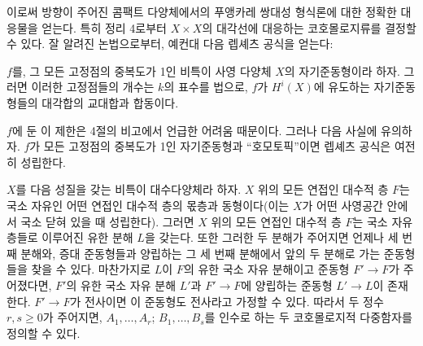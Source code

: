 이로써 방향이 주어진 콤팩트 다양체에서의 푸앵카레 쌍대성 형식론에
대한 정확한 대응물을 얻는다. 특히 정리 4로부터 $X\times X$의
대각선에 대응하는 코호몰로지류를 결정할 수 있다. 잘 알려진
논법으로부터, 예컨대 다음 렙셰츠 공식을 얻는다:

 $f$를, 그 모든 고정점의 중복도가 1인 비특이 사영
다양체 $X$의 자기준동형이라 하자. 그러면 이러한 고정점들의 개수는
$k$의 표수를 법으로,
$f$가 $H^{i}(X)$에 유도하는 자기준동형들의 대각합의 교대합과
합동이다.

$f$에 둔 이 제한은 4절의 비고에서 언급한 어려움 때문이다.
그러나 다음 사실에 유의하자. $f$가 모든 고정점의 중복도가 1인
자기준동형과 “호모토픽”이면 렙셰츠 공식은
여전히 성립한다.


$X$를 다음 성질을 갖는 비특이 대수다양체라 하자. $X$ 위의 모든
연접인 대수적 층 $F$는 국소 자유인 어떤 연접인 대수적 층의 몫층과
동형이다(이는 $X$가 어떤 사영공간 안에서 국소 닫혀 있을 때 성립한다).
그러면 $X$ 위의 모든 연접인 대수적 층 $F$는 국소 자유층들로 이루어진
유한 분해 $L$을 갖는다. 또한 그러한 두 분해가 주어지면 언제나 세 번째
분해와, 증대 준동형들과 양립하는 그 세 번째 분해에서 앞의 두 분해로
가는 준동형들을 찾을 수 있다. 마찬가지로 $L$이 $F$의 유한 국소 자유
분해이고 준동형 $F'\longrightarrow F$가 주어졌다면, $F'$의 유한 국소
자유 분해 $L'$과 $F'\longrightarrow F$에 양립하는 준동형
$L'\longrightarrow L$이 존재한다. $F'\longrightarrow F$가 전사이면 이
준동형도 전사라고 가정할 수 있다. 따라서 두 정수 $r,s\geq0$가 주어지면,
$A_1,\ldots,A_r$; $B_1,\ldots,B_s$를 인수로 하는 두 코호몰로지적
다중함자를 정의할 수 있다.

